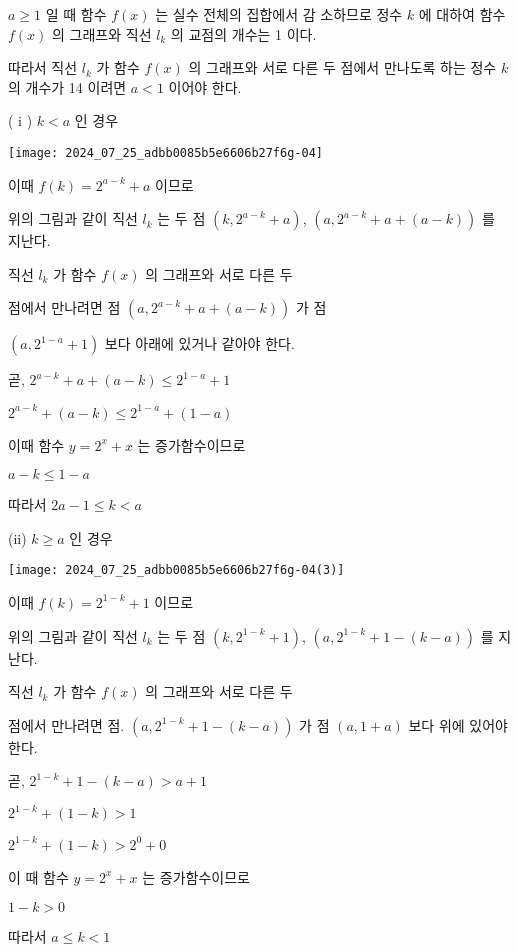 \documentclass[10pt]{article}
\begin{document}
$a \geq 1$ 일 때 함수 $f(x)$ 는 실수 전체의 집합에서 감 소하므로 정수 $k$ 에 대하여 함수 $f(x)$ 의 그래프와 직선 $l_{k}$ 의 교점의 개수는 1 이다.

따라서 직선 $l_{k}$ 가 함수 $f(x)$ 의 그래프와 서로 다른 두 점에서 만나도록 하는 정수 $k$ 의 개수가 14 이려면 $a<1$ 이어야 한다.

( i ) $k<a$ 인 경우

\begin{center}
\texttt{[image: 2024\_07\_25\_adbb0085b5e6606b27f6g-04]}
\end{center}

이때 $f(k)=2^{a-k}+a$ 이므로

위의 그림과 같이 직선 $l_{k}$ 는 두 점 $\left(k, 2^{a-k}+a\right)$, $\left(a, 2^{a-k}+a+(a-k)\right)$ 를 지난다.

직선 $l_{k}$ 가 함수 $f(x)$ 의 그래프와 서로 다른 두

점에서 만나려면 점 $\left(a, 2^{a-k}+a+(a-k)\right)$ 가 점

$\left(a, 2^{1-a}+1\right)$ 보다 아래에 있거나 같아야 한다.

곧, $2^{a-k}+a+(a-k) \leq 2^{1-a}+1$

$2^{a-k}+(a-k) \leq 2^{1-a}+(1-a)$

이때 함수 $y=2^{x}+x$ 는 증가함수이므로

$a-k \leq 1-a$

따라서 $2 a-1 \leq k<a$

(ii) $k \geq a$ 인 경우

\begin{center}
\texttt{[image: 2024\_07\_25\_adbb0085b5e6606b27f6g-04(3)]}
\end{center}

이때 $f(k)=2^{1-k}+1$ 이므로

위의 그림과 같이 직선 $l_{k}$ 는 두 점 $\left(k, 2^{1-k}+1\right)$, $\left(a, 2^{1-k}+1-(k-a)\right)$ 를 지난다.

직선 $l_{k}$ 가 함수 $f(x)$ 의 그래프와 서로 다른 두

점에서 만나려면 점. $\left(a, 2^{1-k}+1-(k-a)\right)$ 가 점 $(a, 1+a)$ 보다 위에 있어야 한다.

곧, $2^{1-k}+1-(k-a)>a+1$

$2^{1-k}+(1-k)>1$

$2^{1-k}+(1-k)>2^{0}+0$

이 때 함수 $y=2^{x}+x$ 는 증가함수이므로

$1-k>0$

따라서 $a \leq k<1$
\end{document}
